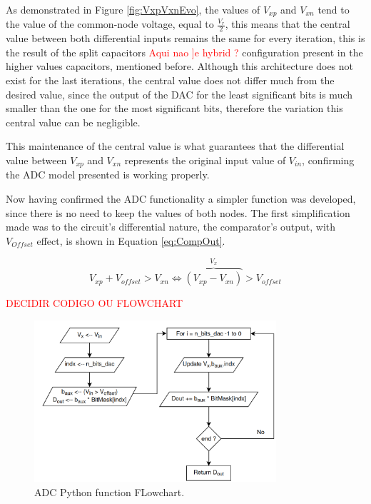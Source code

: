 As demonstrated in Figure \ref{fig:VxpVxnEvo}, the values of $V_{xp}$ and $V_{xn}$ tend to the value of the common-node voltage, equal to $\frac{V_r}{2}$, this means that the central value between both differential inputs remains the same for every iteration, this is the result of the split capacitors \textcolor{red}{Aqui nao ]e hybrid ?} configuration present in the higher values capacitors, mentioned before. Although this architecture does not exist for the last iterations, the central value does not differ much from the desired value, since the output of the DAC for the least significant bits is much smaller than the one for the most significant bits, therefore the variation this central value can be negligible.

This maintenance of the central value is what guarantees that the differential value between $V_{xp}$ and $V_{xn}$ represents the original input value of $V_{in}$, confirming the ADC model presented is working properly.

Now having confirmed the ADC functionality a simpler function was developed, since there is no need to keep the values of both nodes.
The first simplification made was to the circuit's differential nature, the comparator's output, with $V_{Offset}$ effect, is shown in Equation \ref{eq:CompOut}.

\begin{equation}
    V_{xp} + V_{offset} > V_{xn} \Leftrightarrow \overbrace{( V_{xp} - V_{xn} )}^{V_x} > V_{offset} 
    \label{eq:CompOut}
\end{equation}

\textcolor{red}{DECIDIR CODIGO OU FLOWCHART}


\begin{figure}[h]

    \centering
    \includegraphics*[width=0.8\textwidth]{Images/ADCPythonFlowChart.png}
    \caption{ADC Python function FLowchart.}

    \label{fig:ADCFlowChart}
\end{figure}

